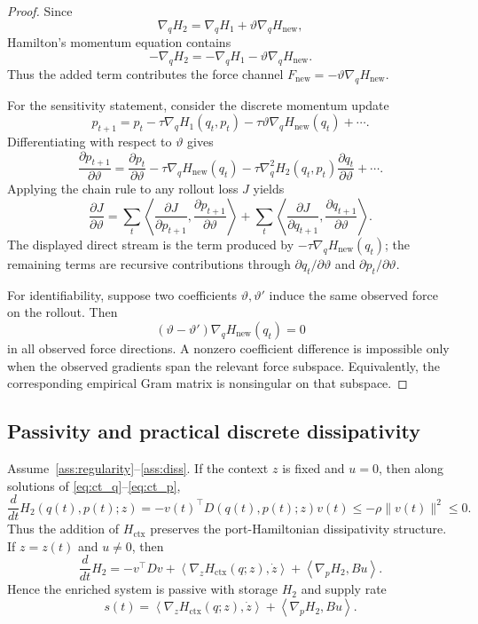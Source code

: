 \begin{proof}
Since
\[
    \nabla_q H_2
    =
    \nabla_q H_1+\vartheta\nabla_qH_{\mathrm{new}},
\]
Hamilton's momentum equation contains
\[
    -\nabla_qH_2
    =
    -\nabla_qH_1-\vartheta\nabla_qH_{\mathrm{new}}.
\]
Thus the added term contributes the force channel
\(F_{\mathrm{new}}=-\vartheta\nabla_qH_{\mathrm{new}}\).

For the sensitivity statement, consider the discrete momentum update
\[
    p_{t+1}
    =
    p_t-\tau\nabla_qH_1(q_t,p_t)
    -\tau\vartheta\nabla_qH_{\mathrm{new}}(q_t)+\cdots .
\]
Differentiating with respect to \(\vartheta\) gives
\[
    \frac{\partial p_{t+1}}{\partial\vartheta}
    =
    \frac{\partial p_t}{\partial\vartheta}
    -\tau\nabla_qH_{\mathrm{new}}(q_t)
    -\tau\nabla_q^2H_2(q_t,p_t)
        \frac{\partial q_t}{\partial\vartheta}
    +\cdots .
\]
Applying the chain rule to any rollout loss \(J\) yields
\[
    \frac{\partial J}{\partial\vartheta}
    =
    \sum_t
    \left\langle
    \frac{\partial J}{\partial p_{t+1}},
    \frac{\partial p_{t+1}}{\partial\vartheta}
    \right\rangle
    +
    \sum_t
    \left\langle
    \frac{\partial J}{\partial q_{t+1}},
    \frac{\partial q_{t+1}}{\partial\vartheta}
    \right\rangle .
\]
The displayed direct stream is the term produced by
\(-\tau\nabla_qH_{\mathrm{new}}(q_t)\); the remaining terms are recursive
contributions through \(\partial q_t/\partial\vartheta\) and
\(\partial p_t/\partial\vartheta\).

For identifiability, suppose two coefficients \(\vartheta,\vartheta'\) induce the same
observed force on the rollout. Then
\[
    (\vartheta-\vartheta')\nabla_qH_{\mathrm{new}}(q_t)=0
\]
in all observed force directions. A nonzero coefficient difference is impossible only
when the observed gradients span the relevant force subspace. Equivalently, the
corresponding empirical Gram matrix is nonsingular on that subspace.
\end{proof}

\subsection{Passivity and practical discrete dissipativity}

\begin{theorem}
\label{thm:continuous_passivity}
Assume~\ref{ass:regularity}--\ref{ass:diss}. If the context \(z\) is
fixed and \(u=0\), then along solutions of \eqref{eq:ct_q}--\eqref{eq:ct_p},
\[
    \frac{d}{dt}H_2(q(t),p(t);z)
    =
    -v(t)^\top D(q(t),p(t);z)v(t)
    \le
    -\rho\|v(t)\|^2
    \le 0 .
\]
Thus the addition of \(H_{\mathrm{ctx}}\) preserves the port-Hamiltonian dissipativity
structure. If \(z=z(t)\) and \(u\neq0\), then
\[
    \frac{d}{dt}H_2
    =
    -v^\top Dv
    +
    \left\langle \nabla_zH_{\mathrm{ctx}}(q;z),\dot z \right\rangle
    +
    \left\langle \nabla_pH_2,Bu \right\rangle .
\]
Hence the enriched system is passive with storage \(H_2\) and supply rate
\[
    s(t)
    =
    \left\langle \nabla_zH_{\mathrm{ctx}}(q;z),\dot z \right\rangle
    +
    \left\langle \nabla_pH_2,Bu \right\rangle .
\]
\end{theorem}

